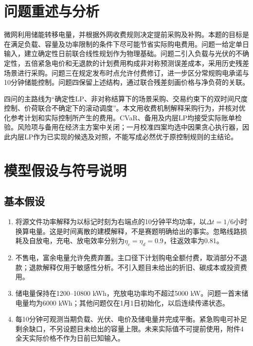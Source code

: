 \section{问题重述与分析}

微网利用储能转移电量，并根据外网收费规则决定提前采购及补购。本题的目标是在满足负载、容量及功率限制的条件下尽可能节省实际购电费用。问题一给定单日输入，建立确定性日前联合线性规划作为物理基础\cite{kong2016,silva2020}。问题二引入负载与光伏的不确定性，五倍紧急电价和无退款的计划费用构成非对称预测误差成本，采用历史残差场景进行采购\cite{abunima2022,marino2018,grover2018}。问题三在规定发布时点允许付费修订，进一步区分常规购电承诺与10分钟储能控制\cite{palma2013,silvente2015,li2016,jani2022}。问题四保留上述结构，通过联合残差刻画价格与净负荷的关联\cite{li2020}。

四问的主路线为“确定性LP、非对称结算下的场景采购、交易约束下的双时间尺度控制、价荷联合不确定下的滚动调度”。本文用收费机制解释采购行为，并核对优化参考计划和实际控制所产生的费用。CVaR、备用及内层LP均接受实际账单检验。风险项与备用在经济主方案中关闭；一月校准四案均选中因果贪心执行器，因此内层LP作为已实现的候选及对照，不能写成必然优于原控制规则的主结论。

\section{模型假设与符号说明}

\subsection{基本假设}

\begin{enumerate}
 \item 将源文件功率解释为以标记时刻为右端点的10分钟平均功率，以$\Delta t=1/6$小时换算电量。这是时间离散的建模解释，不是赛题明确给出的事实。忽略线路损耗及自放电，充电、放电效率分别为$\eta_c=\eta_d=0.9$，往返效率为0.81。
 \item 不售电，富余电量允许免费弃置。主口径下计划购电全额付费，取消部分不退款；退款解释仅用于敏感性分析。不引入题目未给出的折旧、碳成本或投资费用。
 \item 储电量保持在1200--10800 kWh，充放电功率均不超过5000 kW。问题一首末储电量均为6000 kWh；其他问题仅在1月1日初始化，以后连续传递状态。
 \item 每10分钟可观测当期负载、光伏、电价及储电量并完成平衡。紧急购电可补足剩余缺口，不另设题目未给出的容量上限。未来实际值不可提前使用，附件4全天实际价格不作为日前已知输入。
\end{enumerate}

